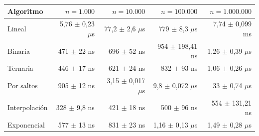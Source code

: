 {\scriptsize
\begin{tabular}{lrrrr}
\toprule
Algoritmo & $n=1.000$ & $n=10.000$ & $n=100.000$ & $n=1.000.000$ \\
\midrule
Lineal & 5,76 $\pm$ 0,23 $\mu$s & 77,2 $\pm$ 2,6 $\mu$s & 779 $\pm$ 8,3 $\mu$s & 7,74 $\pm$ 0,099 ms \\
Binaria & 471 $\pm$ 22 ns & 696 $\pm$ 52 ns & 954 $\pm$ 198,41 ns & 1,26 $\pm$ 0,39 $\mu$s \\
Ternaria & 446 $\pm$ 17 ns & 621 $\pm$ 24 ns & 832 $\pm$ 93 ns & 1,06 $\pm$ 0,26 $\mu$s \\
Por saltos & 905 $\pm$ 12 ns & 3,15 $\pm$ 0,017 $\mu$s & 9,8 $\pm$ 0,072 $\mu$s & 33 $\pm$ 0,74 $\mu$s \\
Interpolaci\'on & 328 $\pm$ 9,8 ns & 421 $\pm$ 18 ns & 500 $\pm$ 96 ns & 554 $\pm$ 131,21 ns \\
Exponencial & 577 $\pm$ 13 ns & 831 $\pm$ 23 ns & 1,16 $\pm$ 0,13 $\mu$s & 1,49 $\pm$ 0,28 $\mu$s \\
\bottomrule
\end{tabular}}\par
